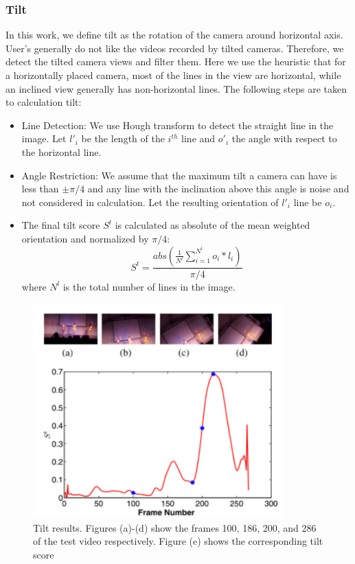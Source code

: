 \documentclass{sig-alternate}
\begin{document}
\subsubsection{Tilt}
In this work, we define tilt as the rotation of the camera around horizontal axis. User's generally do not like the videos recorded by tilted cameras. Therefore, we detect the tilted camera views and filter them. Here we use the heuristic that for a horizontally placed camera, most of the lines in the view are horizontal, while an inclined view generally has non-horizontal lines. The following steps are taken to calculation tilt:
\begin{itemize}
    \item Line Detection: We use Hough transform to detect the straight line in the image. Let $l'_i$ be the length of the $i^{th}$ line and $o'_i$ the angle with respect to the horizontal line.
    \item Angle Restriction: We assume that the maximum tilt a camera can have is less than $\pm\pi/4$ and any line with the inclination above this angle is noise and not considered in calculation. Let the resulting orientation of $l'_i$ line be $o_i$.
    \item The final tilt score $S^t$ is calculated as absolute of the mean weighted orientation and normalized by $\pi/4$:
    \begin{equation}
        S^t=\frac{abs(\frac{1}{N^l}\sum_{i=1}^{N^l} o_i * l_i)}{\pi/4}
    \end{equation}
    where $N^l$ is the total number of lines in the image.
\end{itemize}

\begin{figure}
    \centering
    \includegraphics{img4.png}
    \caption{Tilt results. Figures (a)-(d) show the frames 100, 186, 200, and 286 of the test video respectively. Figure (e) shows the corresponding tilt score}
    \label{fig:fig4}
\end{figure}
\end{document}
